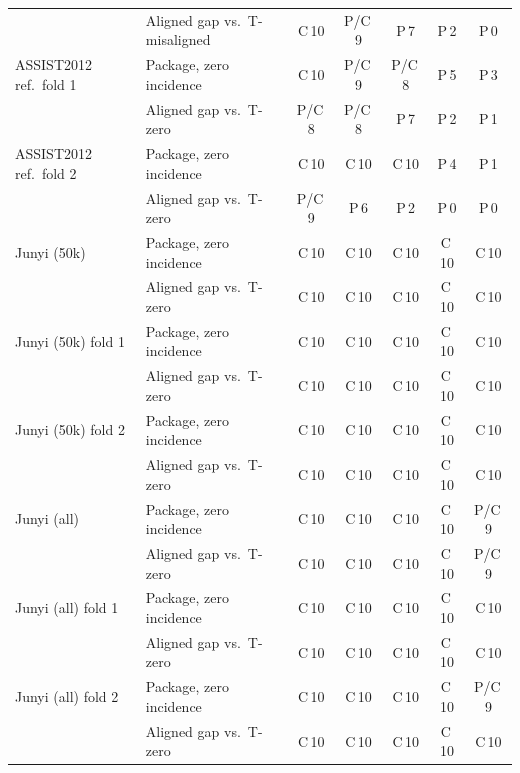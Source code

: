 \begin{table}[tbp]
\begin{tabular}{@{}llccccc@{}}
 & Aligned gap vs.\ T-misaligned & C\,10 & P/C\,9 & P\,7 & P\,2 & P\,0 \\
\addlinespace
ASSIST2012 ref.\ fold 1 & Package, zero incidence & C\,10 & P/C\,9 & P/C\,8 & P\,5 & P\,3 \\
 & Aligned gap vs.\ T-zero & P/C\,8 & P/C\,8 & P\,7 & P\,2 & P\,1 \\
\addlinespace
ASSIST2012 ref.\ fold 2 & Package, zero incidence & C\,10 & C\,10 & C\,10 & P\,4 & P\,1 \\
 & Aligned gap vs.\ T-zero & P/C\,9 & P\,6 & P\,2 & P\,0 & P\,0 \\
\addlinespace
Junyi (50k) & Package, zero incidence & C\,10 & C\,10 & C\,10 & C\,10 & C\,10 \\
 & Aligned gap vs.\ T-zero & C\,10 & C\,10 & C\,10 & C\,10 & C\,10 \\
\addlinespace
Junyi (50k) fold 1 & Package, zero incidence & C\,10 & C\,10 & C\,10 & C\,10 & C\,10 \\
 & Aligned gap vs.\ T-zero & C\,10 & C\,10 & C\,10 & C\,10 & C\,10 \\
\addlinespace
Junyi (50k) fold 2 & Package, zero incidence & C\,10 & C\,10 & C\,10 & C\,10 & C\,10 \\
 & Aligned gap vs.\ T-zero & C\,10 & C\,10 & C\,10 & C\,10 & C\,10 \\
\addlinespace
Junyi (all) & Package, zero incidence & C\,10 & C\,10 & C\,10 & C\,10 & P/C\,9 \\
 & Aligned gap vs.\ T-zero & C\,10 & C\,10 & C\,10 & C\,10 & P/C\,9 \\
\addlinespace
Junyi (all) fold 1 & Package, zero incidence & C\,10 & C\,10 & C\,10 & C\,10 & C\,10 \\
 & Aligned gap vs.\ T-zero & C\,10 & C\,10 & C\,10 & C\,10 & C\,10 \\
\addlinespace
Junyi (all) fold 2 & Package, zero incidence & C\,10 & C\,10 & C\,10 & C\,10 & P/C\,9 \\
 & Aligned gap vs.\ T-zero & C\,10 & C\,10 & C\,10 & C\,10 & C\,10 \\
\bottomrule
\end{tabular}
\end{table}
